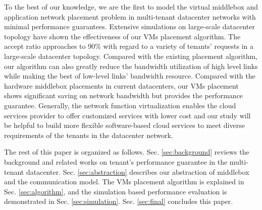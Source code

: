 \documentclass[review]{elsarticle}
\begin{document}
To the best of our knowledge, we are the first to model the  virtual middlebox and application network placement problem in multi-tenant datacenter networks with minimal performance guarantees. Extensive simulations on large-scale datacenter topology have shown the effectiveness of our VMs placement algorithm. The accept ratio approaches to 90\% with regard to a variety of tenants' requests in a large-scale datacenter topology. Compared with the existing placement algorithm, our algorithm can also greatly reduce the bandwidth utilization of high level links while making the best of low-level links' bandwidth resource. %
Compared with the hardware middlebox placements in current datacenters, our VMs placement shows significant saving on network bandwidth but provides the performance guarantee. Generally, the network function virtualization enables the cloud services provider to offer customized services with lower cost and our study will be helpful to build more flexible software-based cloud services to meet diverse requirements of  the tenants in the datacenter network.


The rest of this paper is organized as follows. Sec. \ref{sec:background} reviews the background and related works on tenant's performance guarantee in the multi-tenant datacenter. Sec. \ref{sec:abstraction} describes our abstraction of middlebox and the communication model. The VMs placement algorithm is explained in Sec. \ref{sec:algorithm}, and the simulation based performance evaluation is demonstrated in Sec. \ref{sec:simulation}. Sec. \ref{sec:final} concludes this paper.
\end{document}
